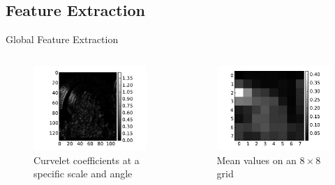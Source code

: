 \documentclass[mathserif]{beamer}
\begin{document}
\subsection{Feature Extraction}
\begin{frame}{Global Feature Extraction}
    \begin{columns}
        \begin{column}{.5\textwidth}
            \begin{figure}
                \includegraphics[width=.9\textwidth]{illustrations/signature_example_curvelet}
                \caption{Curvelet coefficients at a specific scale and angle}
            \end{figure}
        \end{column}
        \begin{column}{.5\textwidth}
            \begin{figure}
                \includegraphics[width=.9\textwidth]{illustrations/signature_example_curvelet_means}
                \caption{Mean values on an $8 \times 8$ grid}
            \end{figure}
        \end{column}
    \end{columns}
\end{frame}
\end{document}
